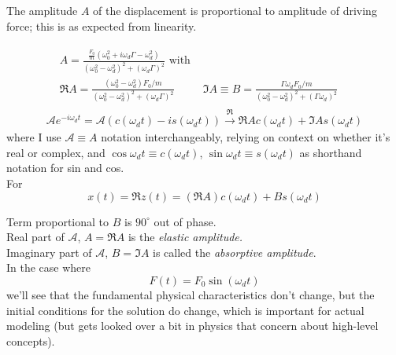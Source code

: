 \documentclass[10pt]{amsart}
\begin{document}
\begin{multicols*}{2}
The amplitude $A$ of the displacement is proportional to amplitude of driving force; this is as expected from linearity.

\[
\begin{gathered}
	\begin{aligned}
		& A = \frac{ \frac{F_0}{m} (\omega_0^2 + i \omega_d \Gamma - \omega_d^2 )}{ (\omega_0^2 - \omega_d^2)^2 + (\omega_d \Gamma)^2 } \text{ with } & \\
		& \Re{A} = \frac{ (\omega_0^2 - \omega_d^2) F_0/m }{(\omega_0^2 - \omega_d^2)^2 + (\omega_d \Gamma)^2} & \Im{A} \equiv B = \frac{ \Gamma \omega_d F_0 /m }{ (\omega_0^2 - \omega_d^2)^2 + (\Gamma \omega_d )^2 }
	\end{aligned} \\
	\mathcal{A} e^{- i\omega_d t} = \mathcal{A} ( c(\omega_dt) - i s(\omega_dt)) \xrightarrow{\Re} \Re{A } c(\omega_d t) + \Im{A} s(\omega_d t)
\end{gathered}
\]
where I use $\mathcal{A} \equiv A$ notation interchangeably, relying on context on whether it's real or complex, and $\cos{\omega_d t} \equiv c(\omega_d t)$, $\sin{\omega_d t} \equiv s(\omega_d t)$ as shorthand notation for sin and cos. \\

For 
\[
x(t) = \Re{z(t)} = (\Re{A}) c(\omega_d t) + Bs(\omega_d t)
\]

Term proportional to $B$ is $90^{\circ}$ out of phase. \\
Real part of $\mathcal{A}$, $A = \Re{A}$ is the \emph{elastic amplitude.} \\
Imaginary part of $\mathcal{A}$, $B = \Im{A}$ is called the \emph{absorptive amplitude}. \\

In the case where 
\[
F(t) = F_0 \sin{(\omega_dt)}
\]
we'll see that the fundamental physical characteristics don't change, but the initial conditions for the solution do change, which is important for actual modeling (but gets looked over a bit in physics that concern about high-level concepts).


\end{multicols*}
\end{document}
